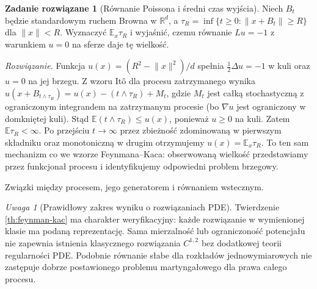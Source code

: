 \documentclass[11pt,a4paper,oneside]{report}
\numberwithin{equation}{chapter}
\theoremstyle{plain}
\theoremstyle{definition}
\newtheorem{zadanie}{Zadanie rozwiązane}[chapter]
\theoremstyle{remark}
\newtheorem{uwaga}{Uwaga}[chapter]
\newcommand{\R}{\mathbb{R}}
\newcommand{\E}{\mathbb{E}}
\newcommand{\norm}[1]{\lVert #1\rVert}
\begin{document}
\begin{zadanie}[Równanie Poissona i średni czas wyjścia]
Niech $B_t$ będzie standardowym ruchem Browna w $\R^d$,
a $\tau_R=\inf\{t\ge0:\norm{x+B_t}\ge R\}$ dla $\norm x<R$.
Wyznaczyć $\E_x\tau_R$ i wyjaśnić, czemu równanie
$Lu=-1$ z warunkiem $u=0$ na sferze daje tę wielkość.

\emph{Rozwiązanie.} Funkcja
$u(x)=(R^2-\norm x^2)/d$ spełnia
$\frac12\Delta u=-1$ w kuli oraz $u=0$ na jej brzegu.
Z wzoru Itô dla procesu zatrzymanego wynika
$u(x+B_{t\wedge\tau_R})=u(x)-(t\wedge\tau_R)+M_t$,
gdzie $M_t$ jest całką stochastyczną z ograniczonym
integrandem na zatrzymanym procesie (bo $\nabla u$ jest
ograniczony w domkniętej kuli). Stąd
$\E(t\wedge\tau_R)\le u(x)$,
ponieważ $u\ge0$ na kuli. Zatem $\E\tau_R<\infty$.
Po przejściu $t\to\infty$ przez zbieżność zdominowaną
w pierwszym składniku oraz monotoniczną w drugim
otrzymujemy $u(x)=\E_x\tau_R$.
To ten sam mechanizm co we wzorze Feynmana--Kaca:
obserwowaną wielkość przedstawiamy przez funkcjonał
procesu i identyfikujemy odpowiedni problem brzegowy.
\end{zadanie}

\begin{center}
\par\smallskip\small Związki między procesem, jego generatorem i równaniem wstecznym.
\end{center}

\begin{uwaga}[Prawidłowy zakres wyniku o rozwiązaniach PDE]
Twierdzenie \ref{th:feynman-kac} ma charakter weryfikacyjny:
każde rozwiązanie w wymienionej klasie ma podaną reprezentację.
Sama mierzalność lub ograniczoność potencjału nie zapewnia
istnienia klasycznego rozwiązania $C^{1,2}$ bez dodatkowej
teorii regularności PDE. Podobnie równanie słabe dla rozkładów
jednowymiarowych nie zastępuje dobrze postawionego problemu
martyngałowego dla prawa całego procesu.
\end{uwaga}
\end{document}
